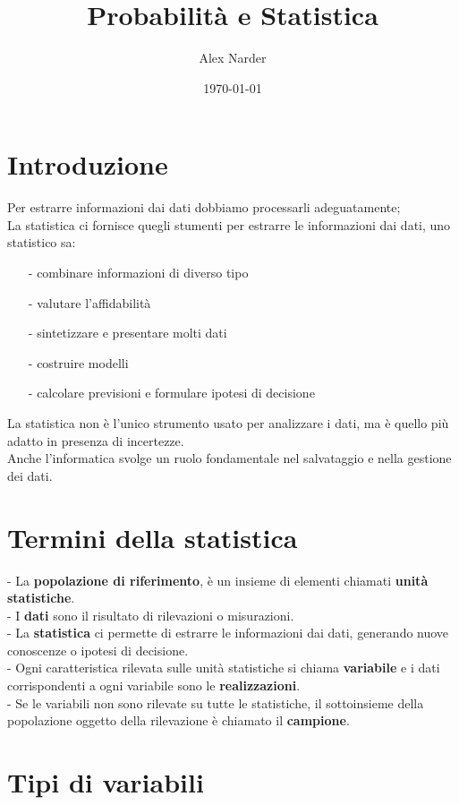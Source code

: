 \documentclass[12pt, letterpaper]{article}
\title{Probabilità e Statistica}
\author{Alex Narder}
\date{\today}
\begin{document}
\maketitle
\tableofcontents
\newpage

\section{Introduzione}

Per estrarre informazioni dai dati dobbiamo processarli adeguatamente;\\ 
La statistica ci fornisce quegli stumenti per estrarre le informazioni dai dati, 
uno statistico sa:
\begin{itemize}
\item[-] combinare informazioni di diverso tipo
\item[-] valutare l'affidabilità
\item[-] sintetizzare e presentare molti dati
\item[-] costruire modelli
\item[-] calcolare previsioni e formulare ipotesi di decisione
\end{itemize}
La statistica non è l'unico strumento usato per analizzare i dati, ma è quello più 
adatto in presenza di incertezze.
\\
Anche l'informatica svolge un ruolo fondamentale nel salvataggio e nella gestione dei dati.

\section{Termini della statistica}

- La \textbf{popolazione di riferimento}, è un insieme di elementi chiamati \textbf{unità statistiche}.
\\- I \textbf{dati} sono il risultato di rilevazioni o misurazioni.
\\- La \textbf{statistica} ci permette di estrarre le informazioni dai dati, generando nuove conoscenze o ipotesi di decisione.
\\- Ogni caratteristica rilevata sulle unità statistiche si chiama \textbf{variabile} e i dati
corrispondenti a ogni variabile sono le \textbf{realizzazioni}.
\\- Se le variabili non sono rilevate su tutte le statistiche, il sottoinsieme della popolazione oggetto della rilevazione
è chiamato il \textbf{campione}.


\section{Tipi di variabili}
\end{document}
